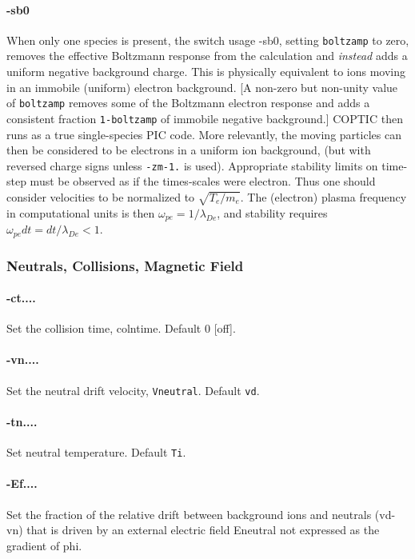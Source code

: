 \documentclass[12pt]{article}
\begin{document}
\paragraph{-sb0} When only one species is present, the switch usage
-sb0, setting \verb!boltzamp! to zero, removes the effective Boltzmann
response from the calculation and \emph{instead} adds a uniform
negative background charge. This is physically equivalent to ions
moving in an immobile (uniform) electron background. [A non-zero but
non-unity value of \verb!boltzamp! removes some of the Boltzmann
electron response and adds a consistent fraction \verb!1-boltzamp! of
immobile negative background.]  COPTIC then runs as a true
single-species PIC code. More relevantly, the moving
particles can then be considered to be electrons in a uniform ion
background, (but with reversed charge signs unless \verb!-zm-1.! is
used). Appropriate stability limits on time-step must be observed as
if the times-scales were electron. Thus one should consider
velocities to be normalized to $\sqrt{T_e/m_e}$. The (electron)
plasma frequency in computational units is then
$\omega_{pe}=1/\lambda_{De}$, and stability requires $\omega_{pe}dt =
dt/\lambda_{De}<1$. 


\subsubsection*{Neutrals, Collisions, Magnetic Field}

\paragraph{-ct....} Set the collision time, colntime. Default 0 [off].

\paragraph{-vn....} Set the neutral drift velocity, \verb!Vneutral!. Default \verb!vd!.

\paragraph{-tn....} Set neutral temperature. Default \verb!Ti!. 

\paragraph{-Ef....} Set the fraction of the relative drift between
background ions and neutrals (vd-vn) that is driven by an external
electric field Eneutral not expressed as the gradient of phi.
\end{document}
